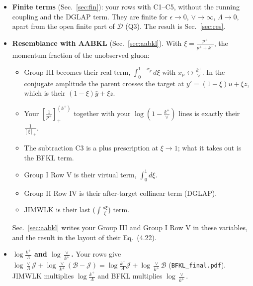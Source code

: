 \documentclass[9pt]{article}
\numberwithin{equation}{section}
\begin{document}
\begin{itemize}
\begin{itemize}
\item The $\beta_0$ terms of Row II part 1 ($\frac{11}{3}$) and Row V 2b UV ($-\frac{11}{6}$) cancel.
\item The $\frac{\beta_0}{2}\delta(1-\xi)$ of $P_{gg}$ comes from the coupling counterterm of LO.
\item What is left of the running coupling is $\frac{\alpha_s\beta_0}{4\pi}\log\frac{\mu_R^2}{\mu_F^2}{\rm LO}+\frac{\alpha_s}{2\pi}N_c\big(\frac{67}{9}-\frac{\pi^2}{3}\big){\rm LO}$ (Sec.~\ref{sec:rc}).
\item DGLAP is $-\frac{\alpha_s}{2\pi}\int_{k^+/\vee}^1\frac{d\xi}{\xi^2}P^{(r)}_{gg,+}{\rm LO}_\xi[\ell_\Delta(\mu_F)]-\log\frac{\vee}{k^+}H_4$ (Sec.~\ref{sec:dglap}).
\end{itemize}
\item \textbf{Finite terms} (Sec.~\ref{sec:fin}): your rows with C1--C5, without the running coupling and the DGLAP term. They are finite for $\epsilon\to0$, $\vee\to\infty$, $\Lambda\to0$, apart from the open finite part of $\mathcal D$ (Q3). The result is Sec.~\ref{sec:res}.
\item \textbf{Resemblance with AABKL} (Sec.~\ref{sec:aabkl}). With $\xi=\frac{p^+}{p^++k^+}$, the momentum fraction of the unobserved gluon:
\begin{itemize}
\item Group III becomes their real term, $\int_0^{1-x_p}d\xi$ with $x_p\leftrightarrow\frac{k^+}{\vee}$. In the conjugate amplitude the parent crosses the target at $y'=(1-\xi)u+\xi z$, which is their $(1-\xi)\bar y+\xi z$.
\item Your $\left[\frac{1}{p^+}\right]_+^{(k^+)}$ together with your $\log(1-\frac{k^+}{\vee})$ lines is exactly their $\frac{1}{[\xi]_+}$.
\item The subtraction C3 is a plus prescription at $\xi\to1$; what it takes out is the BFKL term.
\item Group I Row V is their virtual term, $\int_0^1d\xi$.
\item Group II Row IV is their after-target collinear term (DGLAP).
\item JIMWLK is their last ($\int\frac{d\xi}{\xi}$) term.
\end{itemize}
Sec.~\ref{sec:aabkl} writes your Group III and Group I Row V in these variables, and the result in the layout of their Eq.~(4.22).
\item \textbf{$\log\frac{k^+}{\Lambda}$ and $\log\frac{\vee}{k^+}$.} Your rows give $\log\frac{\vee}{\Lambda}\mathcal J+\log\frac{\vee}{k^+}(\mathcal B-\mathcal J)=\log\frac{k^+}{\Lambda}\mathcal J+\log\frac{\vee}{k^+}\mathcal B$ (\texttt{BFKL\_final.pdf}). JIMWLK multiplies $\log\frac{k^+}{\Lambda}$ and BFKL multiplies $\log\frac{\vee}{k^+}$.

\end{itemize}
\end{document}
